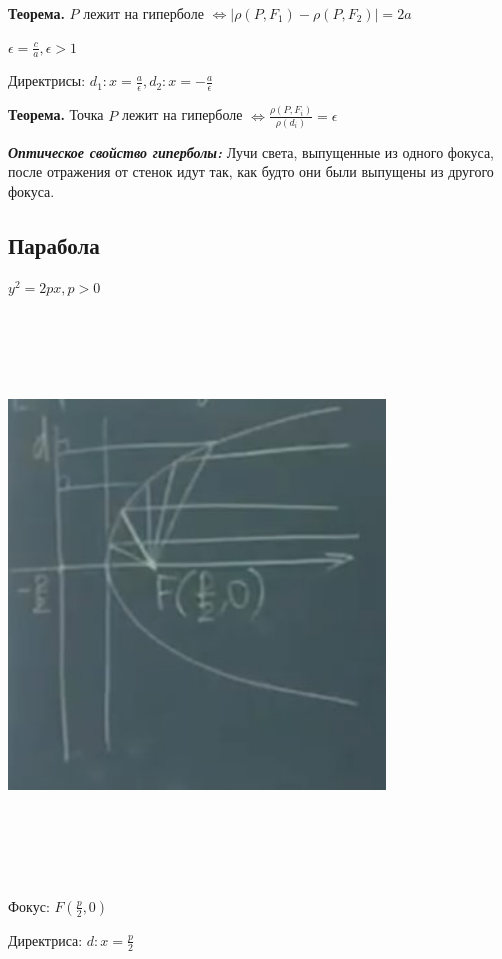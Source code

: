 \bigskip
\textbf{Теорема.} $P$ лежит на гиперболе $\Leftrightarrow |\rho(P, F_1) - \rho(P, F_2)| = 2a$

\bigskip
$\epsilon = \frac{c}{a}, \epsilon > 1$

\bigskip
Директрисы: $d_1: x = \frac{a}{\epsilon}, d_2: x = -\frac{a}{\epsilon}$

\bigskip
\textbf{Теорема.}  Точка $P$ лежит на гиперболе $\Leftrightarrow \frac{\rho(P, F_i)}{\rho(d_i)} = \epsilon$

\bigskip
\textbf{\textit{Оптическое свойство гиперболы:}} Лучи света, выпущенные из одного фокуса, после отражения от стенок идут так, как будто они были выпущены из другого фокуса.

\subsection{Парабола}

$y^2 = 2px, p>0$

\bigskip
\includegraphics[width=10cm,height=15cm,keepaspectratio]{example5.jpg}

\bigskip
Фокус: $F(\frac{p}{2}, 0)$

Директриса: $d: x = \frac{p}{2}$

